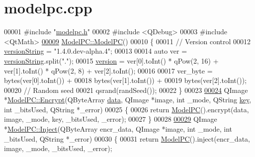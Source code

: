 \hypertarget{modelpc_8cpp_source}{}\section{modelpc.\+cpp}

\begin{DoxyCode}
00001 \textcolor{preprocessor}{#include "\hyperlink{modelpc_8h}{modelpc.h}"}
00002 \textcolor{preprocessor}{#include <QDebug>}
00003 \textcolor{preprocessor}{#include <QtMath>}
\hypertarget{modelpc_8cpp_source.tex_l00009}{}\hyperlink{class_model_p_c_ae12ebe65ec973c02a0de4850a7c1e31c}{00009} \hyperlink{class_model_p_c_ae12ebe65ec973c02a0de4850a7c1e31c}{ModelPC::ModelPC}()
00010 \{
00011     \textcolor{comment}{// Version control}
00012     \hyperlink{class_model_p_c_a5f426725ccf7eefd3c77ea8c720264c9}{versionString} = \textcolor{stringliteral}{"1.4.0.dev-alpha.4"};
00013 
00014     \textcolor{keyword}{auto} ver = \hyperlink{class_model_p_c_a5f426725ccf7eefd3c77ea8c720264c9}{versionString}.split(\textcolor{stringliteral}{"."});
00015     \hyperlink{class_model_p_c_a5af48ab89e19be42a94c34ba00249401}{version} = ver[0].toInt() * qPow(2, 16) + ver[1].toInt() * qPow(2, 8) + ver[2].toInt();
00016 
00017     ver\_byte = bytes(ver[0].toInt()) +
00018             bytes(ver[1].toInt()) +
00019             bytes(ver[2].toInt());
00020     \textcolor{comment}{// Random seed}
00021     qsrand(randSeed());
00022 \}
00023 
\hypertarget{modelpc_8cpp_source.tex_l00024}{}\hyperlink{class_model_p_c_a271cf9285e32df58ffbfc918e6482bbd}{00024} QImage *\hyperlink{class_model_p_c_a271cf9285e32df58ffbfc918e6482bbd}{ModelPC::Encrypt}(QByteArray \hyperlink{namespace_errors_dict_setup_af570460846fb9f0c91abd308a095dcdc}{data}, QImage *image, \textcolor{keywordtype}{int} \_mode, QString 
      \hyperlink{namespace_errors_dict_setup_a09c268098d09ffb8e5504f30fa6d5dd9}{key}, \textcolor{keywordtype}{int} \_bitsUsed, QString *\_error)
00025 \{
00026     \textcolor{keywordflow}{return} \hyperlink{class_model_p_c_ae12ebe65ec973c02a0de4850a7c1e31c}{ModelPC}().encrypt(data, image, \_mode, key, \_bitsUsed, \_error);
00027 \}
00028 
\hypertarget{modelpc_8cpp_source.tex_l00029}{}\hyperlink{class_model_p_c_ac17e68e6aab134621b0d151d74acdc82}{00029} QImage *\hyperlink{class_model_p_c_ac17e68e6aab134621b0d151d74acdc82}{ModelPC::Inject}(QByteArray encr\_data, QImage *image, \textcolor{keywordtype}{int} \_mode, \textcolor{keywordtype}{int} \_bitsUsed, 
      QString *\_error)
00030 \{
00031     \textcolor{keywordflow}{return} \hyperlink{class_model_p_c_ae12ebe65ec973c02a0de4850a7c1e31c}{ModelPC}().inject(encr\_data, image, \_mode, \_bitsUsed, \_error);

\end{DoxyCode}
